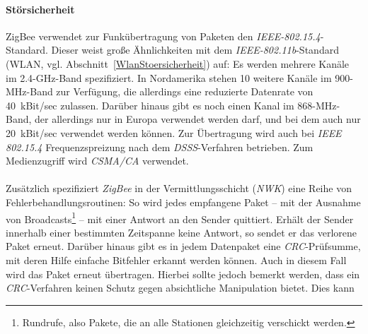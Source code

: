             \paragraph{Störsicherheit}

                ZigBee verwendet zur Funkübertragung von Paketen den \emph{IEEE-802.15.4}-Standard.
                Dieser weist große Ähnlichkeiten mit dem \emph{IEEE-802.11b}-Standard (WLAN, vgl. 
                Abschnitt~\ref{WlanStoersicherheit}) auf: Es werden mehrere Kanäle im
                2.4-GHz-Band spezifiziert. In Nordamerika stehen 10 weitere Kanäle im 900-MHz-Band
                zur Verfügung, die allerdings eine reduzierte Datenrate von 40~kBit/sec zulassen. 
                Darüber hinaus gibt es noch einen Kanal im 868-MHz-Band, der allerdings nur in Europa
                verwendet werden darf, und bei dem auch nur 20~kBit/sec verwendet werden können. Zur Übertragung wird auch bei 
                \emph{IEEE 802.15.4} Frequenzspreizung nach dem \emph{DSSS}-Verfahren betrieben. Zum Medienzugriff
                wird \emph{CSMA/CA} verwendet.\\
                \\
                Zusätzlich spezifiziert \emph{ZigBee} in der Vermittlungsschicht (\emph{NWK}) eine Reihe von Fehlerbehandlungsroutinen:
                So wird jedes empfangene Paket -- mit der Ausnahme von Broadcasts\footnote{Rundrufe, also
                Pakete, die an alle Stationen gleichzeitig verschickt werden.} -- mit einer Antwort
                an den Sender quittiert. Erhält der Sender innerhalb einer bestimmten Zeitspanne
                keine Antwort, so sendet er das verlorene Paket erneut. Darüber hinaus gibt es in jedem
                Datenpaket eine \emph{CRC}-Prüfsumme, mit deren Hilfe einfache Bitfehler erkannt werden können.
                Auch in diesem Fall wird das Paket erneut übertragen. Hierbei sollte jedoch bemerkt werden,
                dass ein \emph{CRC}-Verfahren keinen Schutz gegen absichtliche Manipulation bietet. Dies kann
